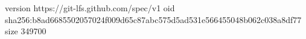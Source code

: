 version https://git-lfs.github.com/spec/v1
oid sha256:b8ad6685502057024f009d65c87abc575d5ad531e566455048b062c038a8df77
size 349700
